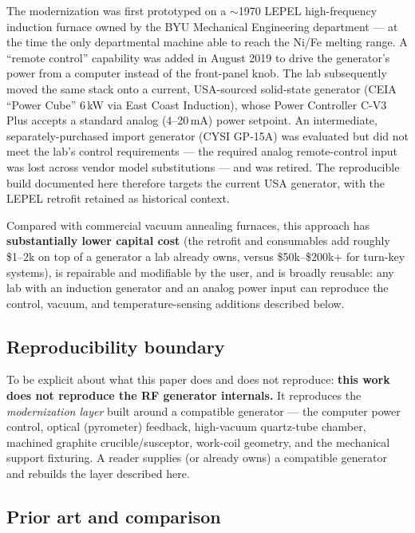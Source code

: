 \documentclass[5p,times]{elsarticle}
\begin{document}
The modernization was first prototyped on a $\sim$1970 LEPEL high-frequency
induction furnace owned by the BYU Mechanical Engineering department --- at the time
the only departmental machine able to reach the Ni/Fe melting range. A ``remote
control'' capability was added in August 2019 to drive the generator's power from a
computer instead of the front-panel knob. The lab subsequently moved the same stack
onto a current, USA-sourced solid-state generator (CEIA ``Power Cube'' 6\,kW via
East Coast Induction), whose Power Controller C-V3 Plus accepts a standard analog
(4--20\,mA) power setpoint. An intermediate, separately-purchased import generator
(CYSI GP-15A) was evaluated but did not meet the lab's control requirements --- the
required analog remote-control input was lost across vendor model substitutions ---
and was retired. The reproducible build documented here therefore targets the
current USA generator, with the LEPEL retrofit retained as historical context.

Compared with commercial vacuum annealing furnaces, this approach has
\textbf{substantially lower capital cost} (the retrofit and consumables add roughly
\$1--2k on top of a generator a lab already owns, versus \$50k--\$200k+ for turn-key
systems), is repairable and modifiable by the user, and is broadly reusable: any lab
with an induction generator and an analog power input can reproduce the control,
vacuum, and temperature-sensing additions described below.

\subsection{Reproducibility boundary}

To be explicit about what this paper does and does not reproduce: \textbf{this work
does not reproduce the RF generator internals.} It reproduces the \emph{modernization
layer} built around a compatible generator --- the computer power control, optical
(pyrometer) feedback, high-vacuum quartz-tube chamber, machined graphite
crucible/susceptor, work-coil geometry, and the mechanical support fixturing. A
reader supplies (or already owns) a compatible generator and rebuilds the layer
described here.

\subsection{Prior art and comparison}
\end{document}
